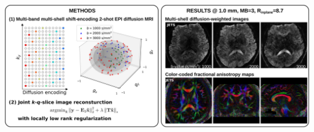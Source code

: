 \documentclass[preprint,12pt,authoryear,review]{elsarticle}
\begin{document}
\begin{frontmatter}
		\begin{abstract}
			The pursuit of high spatial-angular-temporal resolution
			for in vivo diffusion-weighted magnetic resonance imaging
			(DW-MRI) at ultra-high field strength (e.g., \SI{7}{\tesla})
			is important in understanding brain microstructure and function.
			Such pursuit, however, faces several technical challenges.
			First, increased off-resonance and shorter $T_2$ relaxation
			require faster echo train readouts.
			Second, high angular resolution in $q$-space requires
			the use of high and/or multiple $b$-values,
			which increases noise in diffusion-weighted images
			and prolongs scan time.
			Multi-shot interleaved echo-planar imaging (EPI) and
			advanced reconstruction strategies, e.g.,
			multiplexed sensitivity-encoding (MUSE) and
			compressed sensing with structured low-rank matrix completion (MUSSELS),
			have been proven suitable for high-resolution DW-MRI.
			These methods, however, do not explore
			complementary $k$-$q$-space sampling and
			require longer scan time compared to single-shot EPI.
                To address these challenges, we developed a novel joint reconstruction
			for multi-shell multi-band shift-encoding acquisition at \SI{7}{\tesla} (JETS-EPI).
			In comparison to MUSE and MUSSELS,
                it allows for faster acquisition with the use of high inplane acceleration
                and only two shots per diffusion direction.
                Moreover, the proposed joint reconstruction exhibits better denoising of DW images
                and clearer delineation of fiber distributions.
			\vspace{3em}
		\end{abstract}

		\begin{graphicalabstract}
			\includegraphics[width=\linewidth]{../figures/graph.png}
		\end{graphicalabstract}


\end{frontmatter}
\end{document}
